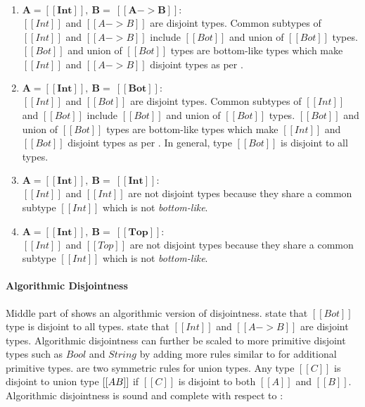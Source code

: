 \begin{enumerate}
  \item $\boldsymbol{A = [[Int]], \ B = \ [[A -> B]]:}$ \\
        $[[Int]]$ and $[[A -> B]]$ are disjoint types. Common subtypes of $[[Int]]$ and $[[A -> B]]$ 
        include $[[Bot]]$ and union of $[[Bot]]$ types. $[[Bot]]$ and union of $[[Bot]]$ types are
        bottom-like types which make $[[Int]]$ and $[[A -> B]]$ disjoint types as per .
  \item $\boldsymbol{A = [[Int]], \ B = \ [[Bot]]:}$ \\
        $[[Int]]$ and $[[Bot]]$ are disjoint types. Common subtypes of $[[Int]]$ and $[[Bot]]$ 
        include $[[Bot]]$ and union of $[[Bot]]$ types. $[[Bot]]$ and union of $[[Bot]]$ types are
        bottom-like types which make $[[Int]]$ and $[[Bot]]$ disjoint types as per .
        In general, type $[[Bot]]$ is disjoint to all types.
  \item $\boldsymbol{A = [[Int]], \ B = \ [[Int]]:}$ \\ 
        $[[Int]]$ and $[[Int]]$ are not disjoint types because they share a common subtype $[[Int]]$ which
        is not \emph{bottom-like}.
  \item $\boldsymbol{A = [[Int]], \ B = \ [[Top]]:}$ \\
        $[[Int]]$ and $[[Top]]$ are not disjoint types because they share a common
        subtype $[[Int]]$ which is not \emph{bottom-like}. 
\end{enumerate}

\begin{comment}
\begin{figure}[t]
  \begin{small}
    \centering
    \drules[ad]{$[[A * B]]$}{Algorithmic Disjointness}{btmr, btml, intl, intr, orl, orr}
  \end{small}
  \caption{Algorithmic Disjointness for \cal.}
  \label{fig:union:ad}
\end{figure}
\end{comment}

\paragraph{Algorithmic Disjointness}
Middle part of  shows an algorithmic version of disjointness.
 state that $[[Bot]]$ type is disjoint to all types.
 state that $[[Int]]$ and $[[A -> B]]$ are disjoint types.
Algorithmic disjointness can further be scaled to more primitive disjoint types such as
$Bool$ and $String$ by adding more rules similar to  for additional primitive types.
 are two symmetric rules for union types. Any type $[[C]]$ is disjoint
to union type $[[A \/ B]]$ if $[[C]]$ is disjoint to both $[[A]]$ and $[[B]]$.
Algorithmic disjointness is sound and complete with respect to :

